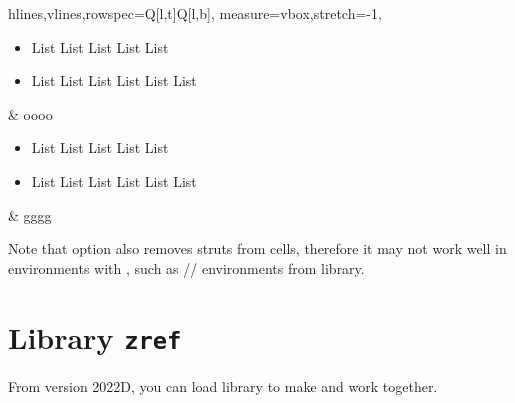 \documentclass[oneside]{book}
\begin{document}
\begin{codehigh}
\begin{tblr}{
  hlines,vlines,rowspec={Q[l,t]Q[l,b]},
  measure=vbox,stretch=-1,
}
  \begin{itemize}[nosep]
    \item List List List List List
    \item List List List List List List
  \end{itemize} & oooo \\
  \begin{itemize}[nosep]
    \item List List List List List
    \item List List List List List List
  \end{itemize} & gggg \\
\end{tblr}
\end{codehigh}

Note that option  also removes struts from cells, therefore it may not work well
in  environments with , such as
// environments from  library.

\section{Library \texttt{zref}}

From version 2022D, you can load  library
to make \CC{\zref} and  work together.
\end{document}
